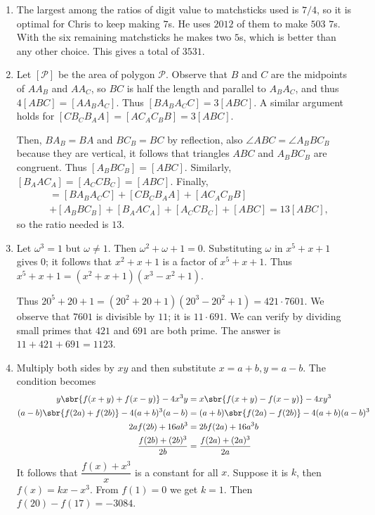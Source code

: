 \documentclass[10pt,paper=letter]{scrartcl}
\begin{document}
\begin{enumerate}
  \item The largest among the ratios of digit value to matchsticks used is $7/4$, so it is optimal for Chris to keep making $7$s. He uses $2012$ of them to make $503$ $7$s. With the six remaining matchsticks he makes two $5$s, which is better than any other choice. This gives a total of $3531$.
  \item Let $[\mathcal{P}]$ be the area of polygon $\mathcal{P}$. Observe that $B$ and $C$ are the midpoints of $AA_B$ and $AA_C$, so $BC$ is half the length and parallel to $A_BA_C$, and thus $4[ABC] = [AA_BA_C]$. Thus $[BA_BA_CC] = 3[ABC]$. A similar argument holds for $[CB_CB_AA] = [AC_AC_BB] = 3[ABC]$.

  Then, $BA_B = BA$ and $BC_B = BC$ by reflection, also $\angle ABC = \angle A_BBC_B$ because they are vertical, it follows that triangles $ABC$ and $A_BBC_B$ are congruent. Thus $[A_BBC_B] = [ABC]$. Similarly, $[B_AAC_A] = [A_CCB_C] = [ABC]$. Finally, \begin{align*}[A_BA_CB_CB_AC_AC_B] &= [BA_BA_CC] + [CB_CB_AA] + [AC_AC_BB] \\ &+ [A_BBC_B] + [B_AAC_A] + [A_CCB_C] + [ABC] = 13[ABC],\end{align*} so the ratio needed is $13$.
  \item Let $\omega^3 = 1$ but $\omega \neq 1$. Then $\omega^2 + \omega + 1 = 0$. Substituting $\omega$ in $x^5 + x + 1$ gives $0$; it follows that $x^2 + x + 1$ is a factor of $x^5 + x + 1$. Thus $x^5 + x + 1 = (x^2 + x + 1)(x^3 - x^2 + 1)$.

  Thus $20^5 + 20 + 1 = (20^2 + 20 + 1)(20^3 - 20^2 + 1) = 421 \cdot 7601$. We observe that $7601$ is divisible by $11$; it is $11 \cdot 691$. We can verify by dividing small primes that $421$ and $691$ are both prime. The answer is $11 + 421 + 691 = 1123$.
  \item Multiply both sides by $xy$ and then substitute $x = a+b, y = a-b$. The condition becomes \begin{align*}
  y\sbr{f(x+y)+f(x-y)} - 4x^3y &= x\sbr{f(x+y)-f(x-y)} - 4xy^3\\
  (a-b)\sbr{f(2a)+f(2b)} - 4(a+b)^3(a-b) &= (a+b)\sbr{f(2a)-f(2b)} - 4(a+b)(a-b)^3\\
  2af(2b) + 16ab^3 &= 2bf(2a) + 16a^3b\\
  \frac{f(2b) + (2b)^3}{2b} &= \frac{f(2a) + (2a)^3}{2a}
  \end{align*}
  It follows that $\dfrac{f(x) + x^3}{x}$ is a constant for all $x$. Suppose it is $k$, then $f(x) = kx - x^3$. From $f(1) = 0$ we get $k=1$. Then $f(20) - f(17) = -3084$.


\end{enumerate}
\end{document}
